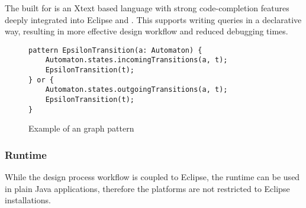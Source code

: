The \dsl built for \viatraq is an Xtext based language with strong code-completion features deeply integrated into Eclipse and \emf. This \dsl supports writing queries in a declarative way, resulting in more effective design workflow and reduced debugging times.

\begin{figure}
	\centering
	\begin{lstlisting}[style=viatraq]
pattern EpsilonTransition(a: Automaton) {
	Automaton.states.incomingTransitions(a, t);
	EpsilonTransition(t);
} or {
	Automaton.states.outgoingTransitions(a, t);
	EpsilonTransition(t);
}
	\end{lstlisting}
	\caption{Example of an \viatraq graph pattern}
	\label{fig:viatraq_example_pattern}
\end{figure}

\subsubsection{Runtime}

While the design process workflow is coupled to Eclipse, the \viatraq runtime can be used in plain Java applications, therefore the platforms are not restricted to Eclipse installations.
